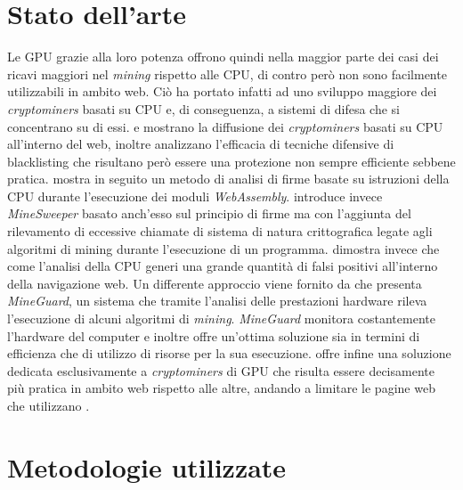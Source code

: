\documentclass[conference, italian]{IEEEtran}
\newcommand\citen[1]{\citeauthor{#1} \citep{#1}}
\newcommand\citetitlen[1]{\citetitle{#1} \citep{#1}}
\begin{document}
\section{Stato dell'arte}\label{sec:related-work}
Le GPU grazie alla loro potenza offrono quindi nella maggior parte dei casi dei ricavi maggiori nel \emph{mining} rispetto alle CPU, di contro però non sono facilmente utilizzabili in ambito web. Ciò ha portato infatti ad uno sviluppo maggiore dei \emph{cryptominers} basati su CPU e, di conseguenza, a sistemi di difesa che si concentrano su di essi. \citen{musch2018web} e \citen{saad2018end} mostrano la diffusione dei \emph{cryptominers} basati su CPU all'interno del web, inoltre analizzano l'efficacia di tecniche difensive di blacklisting che risultano però essere una protezione non sempre efficiente sebbene pratica. \citen{wang2018seismic} mostra in seguito un metodo di analisi di firme basate su istruzioni della CPU durante l'esecuzione dei moduli \emph{WebAssembly}. \citen{konoth2018minesweeper} introduce invece \emph{MineSweeper} basato anch'esso sul principio di firme ma con l'aggiunta del rilevamento di eccessive chiamate di sistema di natura crittografica legate agli algoritmi di mining durante l'esecuzione di un programma. \citen{kharraz2019outguard} dimostra invece che come l'analisi della CPU generi una grande quantità di falsi positivi all'interno della navigazione web. Un differente approccio viene fornito da \citen{tahir2017mining} che presenta \emph{MineGuard}, un sistema che tramite l'analisi delle prestazioni hardware rileva l'esecuzione di alcuni algoritmi di \emph{mining}. \emph{MineGuard} monitora costantemente l'hardware del computer e inoltre offre un'ottima soluzione sia in termini di efficienza che di utilizzo di risorse per la sua esecuzione. \citen{belkin2019risks} offre infine una soluzione dedicata esclusivamente a \emph{cryptominers} di GPU che risulta essere decisamente più pratica in ambito web rispetto alle altre, andando a limitare le pagine web che utilizzano \citetitlen{WebGL}.

\section{Metodologie utilizzate}\label{sec:methodologies}
\end{document}
